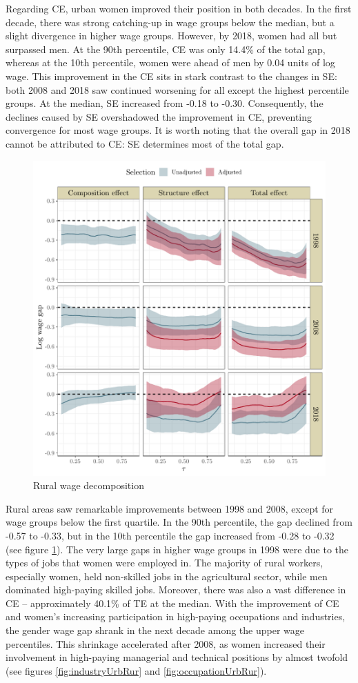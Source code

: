 Regarding CE, urban women improved their position in both decades. In the first decade, there was strong catching-up in wage groups below the median, but a slight divergence in higher wage groups. However, by 2018, women had all but surpassed men. At the 90th percentile, CE was only 14.4\% of the total gap, whereas at the 10th percentile, women were ahead of men by 0.04 units of log wage. This improvement in the CE sits in stark contrast to the changes in SE: both 2008 and 2018 saw continued worsening for all except the highest percentile groups. At the median, SE increased from -0.18 to -0.30. Consequently, the declines caused by SE overshadowed the improvement in CE, preventing convergence for most wage groups. It is worth noting that the overall gap in 2018 cannot be attributed to CE: SE determines most of the total gap.\par   

\begin{figure}[tb] 
	\centering
	\includegraphics[width=.8\textwidth]{./figure/RuralDecom_all_all}
	\caption{Rural wage decomposition}
	\label{fig:decomMainResultRur}
\end{figure}

Rural areas saw remarkable improvements between 1998 and 2008, except for wage groups below the first quartile. In the 90th percentile, the gap declined from -0.57 to -0.33, but in the 10th percentile the gap increased from -0.28 to -0.32 (see figure \ref{fig:decomMainResultRur}). The very large gaps in higher wage groups in 1998 were due to the types of jobs that women were employed in. The majority of rural workers, especially women, held non-skilled jobs in the agricultural sector, while men dominated high-paying skilled jobs. Moreover, there was also a vast difference in CE -- approximately 40.1\% of TE at the median. With the improvement of CE and women’s increasing participation in high-paying occupations and industries, the gender wage gap shrank in the next decade among the upper wage percentiles. This shrinkage accelerated after 2008, as women increased their involvement in high-paying managerial and technical positions by almost twofold (see figures \ref{fig:industryUrbRur} and \ref{fig:occupationUrbRur}).\par

